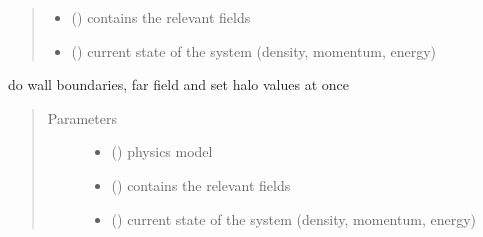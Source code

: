 \documentclass[letterpaper,10pt,english]{sphinxmanual}
\begin{document}
\begin{fulllineitems}
\begin{fulllineitems}
\begin{quote}
\begin{description}
\begin{itemize}
\item {} 
\sphinxAtStartPar
{} ({\hyperref[\detokenize{autoapi/Workspace/index:Workspace.Workspace}]{}}) \textendash{} contains the relevant fields

\item {} 
\sphinxAtStartPar
{} ({\hyperref[\detokenize{autoapi/Field/index:Field.Field}]{}}) \textendash{} current state of the system (density, momentum, energy)

\end{itemize}

\end{description}\end{quote}

\end{fulllineitems}


\begin{fulllineitems}
\label{\detokenize{autoapi/NS_Airfoil/index:NS_Airfoil.NS_Airfoil.bc_all}}
\sphinxAtStartPar
do wall boundaries, far field and set halo values at once
\begin{quote}\begin{description}
\item[{Parameters}] \leavevmode\begin{itemize}
\item {} 
\sphinxAtStartPar
{} ({\hyperref[\detokenize{autoapi/NavierStokes/index:NavierStokes.NavierStokes}]{}}) \textendash{} physics model

\item {} 
\sphinxAtStartPar
{} ({\hyperref[\detokenize{autoapi/Workspace/index:Workspace.Workspace}]{}}) \textendash{} contains the relevant fields

\item {} 
\sphinxAtStartPar
{} ({\hyperref[\detokenize{autoapi/Field/index:Field.Field}]{}}) \textendash{} current state of the system (density, momentum, energy)


\end{itemize}
\end{description}
\end{quote}
\end{fulllineitems}
\end{fulllineitems}
\end{document}
